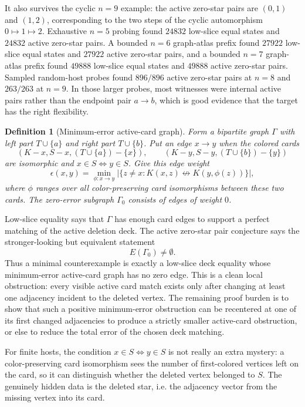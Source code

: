 \documentclass[11pt]{article}
\newtheorem{definition}{Definition}
\begin{document}
It also survives the cyclic \(n=9\) example: the active zero-star pairs are
\((0,1)\) and \((1,2)\), corresponding to the two steps of the cyclic
automorphism \(0\mapsto1\mapsto2\).  Exhaustive \(n=5\) probing found
\(24832\) low-slice equal states and \(24832\) active zero-star pairs.  A
bounded \(n=6\) graph-atlas prefix found \(27922\) low-slice equal states and
\(27922\) active zero-star pairs, and a bounded \(n=7\) graph-atlas prefix
found \(49888\) low-slice equal states and \(49888\) active zero-star pairs.
Sampled random-host probes found \(896/896\) active zero-star pairs at
\(n=8\) and \(263/263\) at \(n=9\).  In those larger probes, most witnesses
were internal active pairs rather than the endpoint pair \(a\to b\), which is
good evidence that the target has the right flexibility.

\begin{definition}[Minimum-error active-card graph]
Form a bipartite graph \(\Gamma\) with left part \(T\cup\{a\}\) and right part
\(T\cup\{b\}\).  Put an edge \(x\to y\) when the colored cards
\[
  (K-x,S-x,(T\cup\{a\})-\{x\}),\qquad
  (K-y,S-y,(T\cup\{b\})-\{y\})
\]
are isomorphic and \(x\in S\iff y\in S\).  Give this edge weight
\[
  \epsilon(x,y)=
  \min_{\phi:x\to y}
  \left|\{z\neq x: K(x,z)\not\leftrightarrow K(y,\phi(z))\}\right|,
\]
where \(\phi\) ranges over all color-preserving card isomorphisms between
these two cards.  The zero-error subgraph \(\Gamma_0\) consists of edges of
weight \(0\).
\end{definition}

Low-slice equality says that \(\Gamma\) has enough card edges to support a
perfect matching of the active deletion deck.  The active zero-star pair
conjecture says the stronger-looking but equivalent statement
\[
  E(\Gamma_0)\neq\emptyset.
\]
Thus a minimal counterexample is exactly a low-slice deck equality whose
minimum-error active-card graph has no zero edge.  This is a clean local
obstruction: every visible active card match exists only after changing at
least one adjacency incident to the deleted vertex.  The remaining proof
burden is to show that such a positive minimum-error obstruction can be
recentered at one of its first changed adjacencies to produce a strictly
smaller active-card obstruction, or else to reduce the total error of the
chosen deck matching.

For finite hosts, the condition \(x\in S\iff y\in S\) is not really an extra
mystery: a color-preserving card isomorphism sees the number of first-colored
vertices left on the card, so it can distinguish whether the deleted vertex
belonged to \(S\).  The genuinely hidden data is the deleted star, i.e. the
adjacency vector from the missing vertex into its card.
\end{document}
